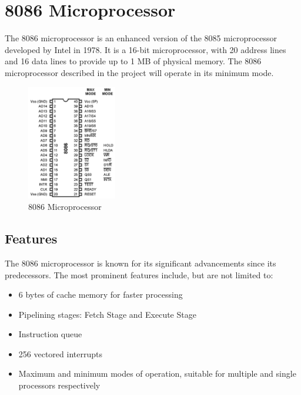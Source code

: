 \newpage
\section{8086 Microprocessor}
The 8086 microprocessor is an enhanced version of the 8085 microprocessor developed by Intel in 1978. It is a 16-bit microprocessor, with 20 address lines and 16 data lines to provide up to 1 MB of physical memory. The 8086 microprocessor described in the project will operate in its minimum mode.

    \begin{figure}[h]
        \begin{center}
            \includegraphics[width=0.35\textwidth]{figures/01_8086.png}
            \caption{8086 Microprocessor} \label{fig:8086}
        \end{center}
    \end{figure}

    \subsection{Features}
    The 8086 microprocessor is known for its significant advancements since its predecessors. The most prominent features include, but are not limited to:

        \begin{itemize}

            \item 6 bytes of cache memory for faster processing

            \item Pipelining stages: Fetch Stage and Execute Stage

            \item Instruction queue

            \item 256 vectored interrupts

            \item Maximum and minimum modes of operation, suitable for multiple and single processors respectively

        \end{itemize}

